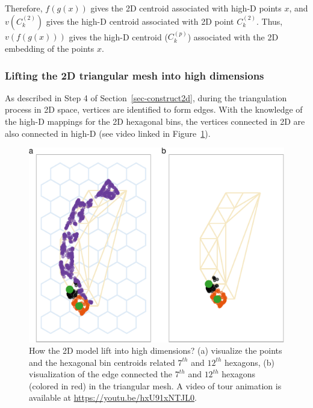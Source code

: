 \documentclass[
  12pt]{article}
\begin{document}
Therefore, \(f(g(x))\) gives the 2D centroid associated with high-D
points \(x\), and \(v(C_k^{(2)})\) gives the high-D centroid associated
with 2D point \(C_k^{(2)}\). Thus, \(v(f(g(x)))\) gives the high-D
centroid (\(C_k^{(p)}\)) associated with the 2D embedding of the points
\(x\).

\hypertarget{lifting-the-2d-triangular-mesh-into-high-dimensions}{%
\subsubsection{Lifting the 2D triangular mesh into high
dimensions}\label{lifting-the-2d-triangular-mesh-into-high-dimensions}}

As described in Step 4 of Section~\ref{sec-construct2d}, during the
triangulation process in 2D space, vertices are identified to form
edges. With the knowledge of the high-D mappings for the 2D hexagonal
bins, the vertices connected in 2D are also connected in high-D (see
video linked in Figure~\ref{fig-wkhighD}).

\begin{figure}

{\centering \includegraphics{paper_files/figure-pdf/fig-wkhighD-1.pdf}

}

\caption{\label{fig-wkhighD}How the 2D model lift into high dimensions?
(a) visualize the points and the hexagonal bin centroids related
\(7^{th}\) and \(12^{th}\) hexagons, (b) visualization of the edge
connected the \(7^{th}\) and \(12^{th}\) hexagons (colored in red) in
the triangular mesh. A video of tour animation is available at
\url{https://youtu.be/hxU91xNTJL0}.}

\end{figure}
\end{document}
